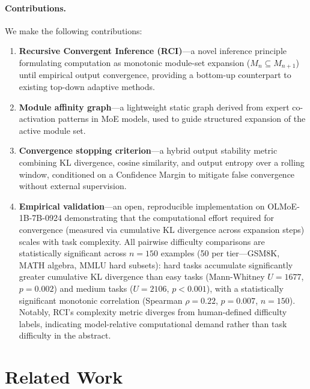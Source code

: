\documentclass{article}
\begin{document}
\paragraph{Contributions.} We make the following contributions:
\begin{enumerate}
    \item \textbf{Recursive Convergent Inference (RCI)}---a novel
    inference principle formulating computation as monotonic
    module-set expansion ($M_n \subseteq M_{n+1}$) until empirical
    output convergence, providing a bottom-up counterpart to
    existing top-down adaptive methods.

    \item \textbf{Module affinity graph}---a lightweight static
    graph derived from expert co-activation patterns in MoE models,
    used to guide structured expansion of the active module set.

    \item \textbf{Convergence stopping criterion}---a hybrid output
    stability metric combining KL divergence, cosine similarity,
    and output entropy over a rolling window, conditioned on a
    Confidence Margin to mitigate false convergence without
    external supervision.

    \item \textbf{Empirical validation}---an open, reproducible
    implementation on OLMoE-1B-7B-0924 demonstrating that the
    computational effort required for convergence (measured via
    cumulative KL divergence across expansion steps) scales with
    task complexity.
    All pairwise difficulty comparisons are statistically
    significant across $n{=}150$ examples (50 per tier---GSM8K,
    MATH algebra, MMLU hard subsets): hard tasks accumulate
    significantly greater cumulative KL divergence than easy
    tasks (Mann-Whitney $U{=}1677$, $p{=}0.002$) and medium
    tasks ($U{=}2106$, $p{<}0.001$), with a statistically
    significant monotonic correlation (Spearman $\rho{=}0.22$,
    $p{=}0.007$, $n{=}150$).
    Notably, RCI's complexity metric diverges from human-defined
    difficulty labels, indicating model-relative computational
    demand rather than task difficulty in the abstract.
\end{enumerate}

\section{Related Work}
\label{sec:related}
\end{document}
